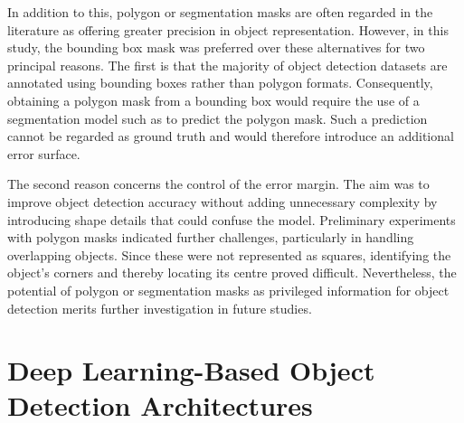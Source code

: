In addition to this, polygon or segmentation masks are often regarded in the literature \cite{mask_to_annotation, lupi_od_extra1, lupi_od_extra2} as offering greater precision in object representation. However, in this study, the bounding box mask was preferred over these alternatives for two principal reasons. The first is that the majority of object detection datasets are annotated using bounding boxes rather than polygon formats. Consequently, obtaining a polygon mask from a bounding box would require the use of a segmentation model such as \cite{maskrcnn, deeplabv3, sam, sam2} to predict the polygon mask. Such a prediction cannot be regarded as ground truth and would therefore introduce an additional error surface.

The second reason concerns the control of the error margin. The aim was to improve object detection accuracy without adding unnecessary complexity by introducing shape details that could confuse the model. Preliminary experiments with polygon masks indicated further challenges, particularly in handling overlapping objects. Since these were not represented as squares, identifying the object’s corners and thereby locating its centre proved difficult. Nevertheless, the potential of polygon or segmentation masks as privileged information for object detection merits further investigation in future studies.


\section{Deep Learning-Based Object Detection Architectures}
\label{sec:4_distillation_architectures}

